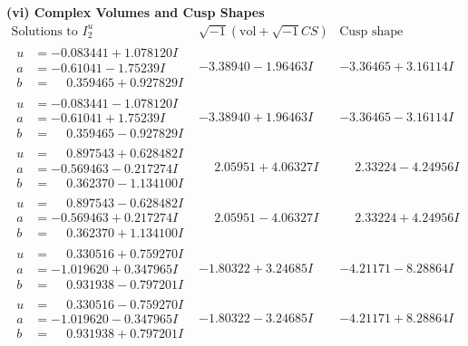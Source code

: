 \documentclass[1p]{elsarticle_modified}
\theoremstyle{definition}
\newcommand{\I}{\sqrt{-1}}
\begin{document}
\newpage\flushleft \textbf{(vi) Complex Volumes and Cusp Shapes}
$$\begin{array}{c|c|c}  
\text{Solutions to }I^u_{2}& \I (\text{vol} + \sqrt{-1}CS) & \text{Cusp shape}\\
 \hline 
\begin{aligned}
u &= -0.083441 + 1.078120 I \\
a &= -0.61041 - 1.75239 I \\
b &= \phantom{-}0.359465 + 0.927829 I\end{aligned}
 & -3.38940 - 1.96463 I & -3.36465 + 3.16114 I \\ \hline\begin{aligned}
u &= -0.083441 - 1.078120 I \\
a &= -0.61041 + 1.75239 I \\
b &= \phantom{-}0.359465 - 0.927829 I\end{aligned}
 & -3.38940 + 1.96463 I & -3.36465 - 3.16114 I \\ \hline\begin{aligned}
u &= \phantom{-}0.897543 + 0.628482 I \\
a &= -0.569463 - 0.217274 I \\
b &= \phantom{-}0.362370 - 1.134100 I\end{aligned}
 & \phantom{-}2.05951 + 4.06327 I & \phantom{-}2.33224 - 4.24956 I \\ \hline\begin{aligned}
u &= \phantom{-}0.897543 - 0.628482 I \\
a &= -0.569463 + 0.217274 I \\
b &= \phantom{-}0.362370 + 1.134100 I\end{aligned}
 & \phantom{-}2.05951 - 4.06327 I & \phantom{-}2.33224 + 4.24956 I \\ \hline\begin{aligned}
u &= \phantom{-}0.330516 + 0.759270 I \\
a &= -1.019620 + 0.347965 I \\
b &= \phantom{-}0.931938 - 0.797201 I\end{aligned}
 & -1.80322 + 3.24685 I & -4.21171 - 8.28864 I \\ \hline\begin{aligned}
u &= \phantom{-}0.330516 - 0.759270 I \\
a &= -1.019620 - 0.347965 I \\
b &= \phantom{-}0.931938 + 0.797201 I\end{aligned}
 & -1.80322 - 3.24685 I & -4.21171 + 8.28864 I \\ \hline\begin{aligned}

\end{aligned}
\end{array}$$
\end{document}
